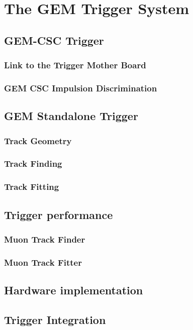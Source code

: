 \chapter{The GEM Trigger System}
\label{chap:gem_trigger}

    \section{GEM-CSC Trigger}
        \subsection{Link to the Trigger Mother Board}
        \subsection{GEM CSC Impulsion Discrimination}

    \section{GEM Standalone Trigger}
        \subsection{Track Geometry}
        \subsection{Track Finding}
        \subsection{Track Fitting}

    \section{Trigger performance}
        \subsection{Muon Track Finder}
        \subsection{Muon Track Fitter}

    \section{Hardware implementation}

    \section{Trigger Integration}

